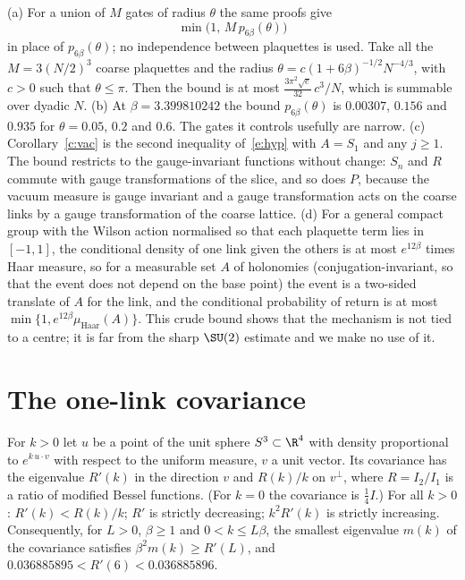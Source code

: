 \begin{remark}\label{r:ret}
(a) For a union of $M$ gates of radius $\theta$ the same proofs give
\[\min\big(1,\,M\,p_{6\beta}(\theta)\big)\]
in place of $p_{6\beta}(\theta)$; no independence between plaquettes is used. Take all the
$M=3(N/2)^3$ coarse plaquettes and the radius $\theta=c(1+6\beta)^{-1/2}N^{-4/3}$, with $c>0$ such that
$\theta\le\pi$. Then the bound is at most $\tfrac{3\pi^2\sqrt e}{32}\,c^3/N$, which is summable over dyadic $N$.
(b) At $\beta=3.399810242$ the bound $p_{6\beta}(\theta)$ is $0.00307$, $0.156$ and $0.935$ for
$\theta=0.05$, $0.2$ and $0.6$. The gates it controls usefully are narrow. (c) Corollary~\ref{c:vac} is the
second inequality of~\eqref{e:hyp} with $A=S_1$ and any $j\ge1$. The bound restricts to the gauge-invariant functions without change: $S_n$ and $R$ commute with gauge
transformations of the slice, and so does $P$, because the vacuum measure is gauge invariant and a gauge
transformation acts on the coarse links by a gauge transformation of the coarse lattice. (d) For a general compact group with the Wilson action normalised so that each plaquette term lies in
$[-1,1]$, the conditional density of one link given the others is at most $e^{12\beta}$ times Haar measure,
so for a measurable set $A$ of holonomies (conjugation-invariant, so that the event does not depend on the
base point) the event is a two-sided translate of $A$ for the link, and the conditional probability of return
is at most $\min\{1,e^{12\beta}\mu_{\mathrm{Haar}}(A)\}$. This crude bound shows that the mechanism is not tied to a
centre; it is far from the sharp $\SU(2)$ estimate and we make no use of it.
\end{remark}

\section{The one-link covariance}\label{s:haar}
\begin{proposition}\label{p:haar}
For $k>0$ let $u$ be a point of the unit sphere $S^3\subset\R^4$ with density proportional to
$e^{k\,u\cdot v}$ with respect to the uniform measure, $v$ a unit vector. Its covariance has the eigenvalue
$R'(k)$ in the direction $v$ and $R(k)/k$ on $v^\perp$, where $R=I_2/I_1$ is a ratio of modified Bessel
functions. (For $k=0$ the covariance is $\tfrac14I$.) For all $k>0$: $R'(k)<R(k)/k$; $R'$ is strictly decreasing;
$k^2R'(k)$ is strictly increasing.
Consequently, for $L>0$, $\beta\ge1$ and $0<k\le L\beta$, the smallest eigenvalue $m(k)$ of the covariance
satisfies $\beta^2m(k)\ge R'(L)$, and $0.036885895<R'(6)<0.036885896$.
\end{proposition}

